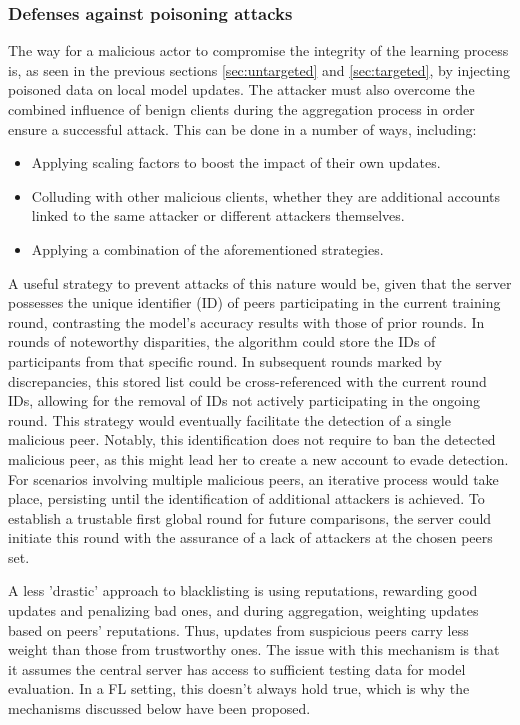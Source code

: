 \subsubsection{Defenses against poisoning attacks}\label{sec:defenses}
The way for a malicious actor to compromise the integrity of the learning process is, as seen in the previous sections \ref{sec:untargeted} and \ref{sec:targeted}, by injecting poisoned data on local model updates. The attacker must also overcome the combined influence of benign clients during the aggregation process in order ensure a successful attack. This can be done in a number of ways, including:
\begin{itemize}
        \item Applying scaling factors to boost the impact of their own updates.
        \item Colluding with other malicious clients, whether they are additional accounts linked to the same attacker or different attackers themselves.
        \item Applying a combination of the aforementioned strategies.
\end{itemize}

A useful strategy to prevent attacks of this nature would be, given that the server possesses the unique identifier (ID) of peers participating in the current training round, contrasting the model's accuracy results with those of prior rounds. In rounds of noteworthy disparities, the algorithm could store the IDs of participants from that specific round. In subsequent rounds marked by discrepancies, this stored list could be cross-referenced with the current round IDs, allowing for the removal of IDs not actively participating in the ongoing round. This strategy would eventually facilitate the detection of a single malicious peer. Notably, this identification does not require to ban the detected malicious peer, as this might lead her to create a new account to evade detection.
For scenarios involving multiple malicious peers, an iterative process would take place, persisting until the identification of additional attackers is achieved. To establish a trustable first global round for future comparisons, the server could initiate this round with the assurance of a lack of attackers at the chosen peers set.


A less 'drastic' approach to blacklisting is using reputations, rewarding good updates and penalizing bad ones, and during aggregation, weighting updates based on peers' reputations. Thus, updates from suspicious peers carry less weight than those from trustworthy ones.
The issue with this mechanism is that it assumes the central server has access to sufficient testing data for model evaluation. In a FL setting, this doesn't always hold true, which is why the mechanisms discussed below have been proposed.



